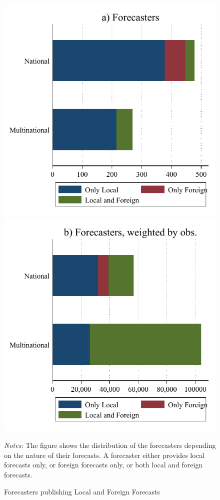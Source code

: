 \documentclass[letterpaper,12pt]{article}
\newenvironment{fignote}{\footnotesize \begin{singlespace} \noindent}{\end{singlespace} \par }
\begin{document}
\begin{figure}[H]
\begin{center}
		\includegraphics[width=.4\linewidth]{../output/figures/loc_for_inst.pdf}
		\includegraphics[width=.4\linewidth]{../output/figures/loc_for_obs.pdf}	
	\caption{Forecasters publishing Local and Foreign Forecasts}
		\label{fig:loc_for}
\end{center}

	\begin{fignote}
		\textit{Notes:} The figure shows the distribution of the forecasters depending on the nature of their forecasts. A forecaster either provides local forecasts only, or foreign forecasts only, or both local and foreign forecasts.
	\end{fignote}
\end{figure}
\end{document}
